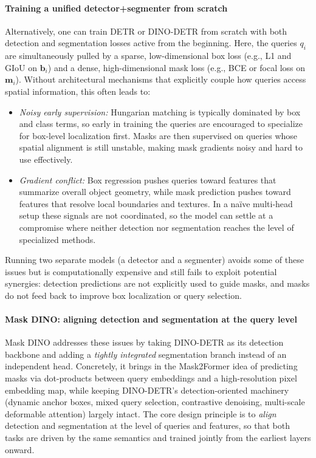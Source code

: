 \begin{enrichment}
\begin{enrichment}
		\paragraph{Training a unified detector+segmenter from scratch}
		Alternatively, one can train DETR or DINO-DETR from scratch with both detection and segmentation losses active from the beginning. Here, the queries $q_i$ are simultaneously pulled by a sparse, low-dimensional box loss (e.g., L1 and GIoU on $\mathbf{b}_i$) and a dense, high-dimensional mask loss (e.g., BCE or focal loss on $\mathbf{m}_i$). Without architectural mechanisms that explicitly couple how queries access spatial information, this often leads to:
		\begin{itemize}
			\item \emph{Noisy early supervision:} Hungarian matching is typically dominated by box and class terms, so early in training the queries are encouraged to specialize for box-level localization first. Masks are then supervised on queries whose spatial alignment is still unstable, making mask gradients noisy and hard to use effectively.
			\item \emph{Gradient conflict:} Box regression pushes queries toward features that summarize overall object geometry, while mask prediction pushes toward features that resolve local boundaries and textures. In a naïve multi-head setup these signals are not coordinated, so the model can settle at a compromise where neither detection nor segmentation reaches the level of specialized methods.
		\end{itemize}
		Running two separate models (a detector and a segmenter) avoids some of these issues but is computationally expensive and still fails to exploit potential synergies: detection predictions are not explicitly used to guide masks, and masks do not feed back to improve box localization or query selection.
		
		\paragraph{Mask DINO: aligning detection and segmentation at the query level}
		Mask DINO addresses these issues by taking DINO-DETR as its detection backbone and adding a \emph{tightly integrated} segmentation branch instead of an independent head. Concretely, it brings in the Mask2Former idea of predicting masks via dot-products between query embeddings and a high-resolution pixel embedding map, while keeping DINO-DETR's detection-oriented machinery (dynamic anchor boxes, mixed query selection, contrastive denoising, multi-scale deformable attention) largely intact. The core design principle is to \emph{align} detection and segmentation at the level of queries and features, so that both tasks are driven by the same semantics and trained jointly from the earliest layers onward.
		

\end{enrichment}
\end{enrichment}
